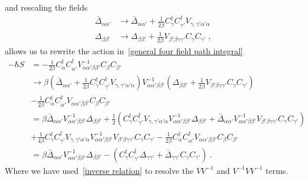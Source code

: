 \documentclass{article}
\begin{document}
and rescaling the fields
\begin{align}
    \bar{\Delta}_{\alpha \alpha'} &\rightarrow \bar{\Delta}_{\alpha \alpha'} + \frac{1}{2\beta}  C^{\dagger}_{\gamma} C^{\dagger}_{\gamma'} V_{\gamma,\gamma' \alpha' \alpha}\nonumber\\
         \Delta_{\beta \beta'}    &\rightarrow \Delta_{\beta \beta'} + \frac{1}{2\beta} V_{\beta' \beta \gamma \gamma'} C_{\gamma} C_{\gamma'}\label{rescaling hs-fields}\;,
\end{align}
allows us to rewrite the action in~\cref{general four field path integral} 
\begin{align}
     - \hbar S &= -\frac{1}{2\beta}C^{\dagger}_{\alpha} C^{\dagger}_{\alpha'} V^{-1}_{\alpha \alpha' \beta \beta'} C_{\beta} C_{\beta'} \nonumber\\
       &\rightarrow \beta \left(\bar{\Delta}_{\alpha \alpha'} + \frac{1}{2 \beta} C^{\dagger}_{\gamma} C^{\dagger}_{\gamma'} V_{\gamma,\gamma' \alpha' \alpha}\right) V^{-1}_{\alpha \alpha' \beta \beta'} 
       \left(\Delta_{\beta \beta'} + \frac{1}{2 \beta} V_{\beta' \beta \gamma \gamma'} C_{\gamma} C_{\gamma'}\right) \nonumber \\
       &- \frac{1}{2\beta}C^{\dagger}_{\alpha} C^{\dagger}_{\alpha'} V_{\alpha \alpha' \beta \beta'} C_{\beta} C_{\beta'} \label{hs-transformation}\\
       &= \beta \bar{\Delta}_{\alpha \alpha'} V^{-1}_{\alpha \alpha' \beta \beta'} \Delta_{\beta \beta'} + \frac{1}{2}\left( C^{\dagger}_{\gamma} C^{\dagger}_{\gamma'} V_{\gamma,\gamma' \alpha' \alpha}  V^{-1}_{\alpha \alpha' \beta \beta'} \Delta_{\beta \beta'}+ \bar{\Delta}_{\alpha \alpha'} V^{-1}_{\alpha \alpha' \beta \beta'} V_{\beta' \beta \gamma \gamma'} C_{\gamma} C_{\gamma'}\right) \nonumber \\
       &+ \frac{1}{4\beta} C^{\dagger}_{\gamma} C^{\dagger}_{\gamma'} V_{\gamma,\gamma' \alpha' \alpha}  V^{-1}_{\alpha \alpha' \beta \beta'} V_{\beta' \beta \gamma \gamma'} C_{\gamma} C_{\gamma'}  - \frac{1}{2\beta}C^{\dagger}_{\alpha} C^{\dagger}_{\alpha'} V_{\alpha \alpha' \beta \beta'} C_{\beta} C_{\beta'} \nonumber\\
       &= \beta\bar{\Delta}_{\alpha \alpha'} V^{-1}_{\alpha \alpha' \beta \beta'} \Delta_{\beta \beta'} - \left( C^{\dagger}_{\gamma} C^{\dagger}_{\gamma'} \Delta_{\gamma \gamma'}+ \bar{\Delta}_{\gamma \gamma'}  C_{\gamma} C_{\gamma'}\right) \nonumber \;.
\end{align}
Where we have used~\cref{inverse relation} to resolve the $V V^{-1}$ and $V^{-1} V V^{-1}$ terms. 
\end{document}
